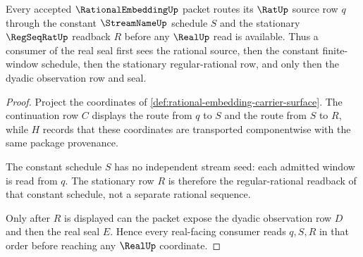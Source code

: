 \begin{theorem}
\label{thm:rational-embedding-constant-sequence-route}
Every accepted $\RationalEmbeddingUp$ packet routes its $\RatUp$ source row $q$ through the constant $\StreamNameUp$ schedule $S$ and the stationary $\RegSeqRatUp$ readback $R$ before any $\RealUp$ read is available. Thus a consumer of the real seal first sees the rational source, then the constant finite-window schedule, then the stationary regular-rational row, and only then the dyadic observation row and seal.
\end{theorem}
\begin{proof}
Project the coordinates of \autoref{def:rational-embedding-carrier-surface}. The continuation row $C$ displays the route from $q$ to $S$ and the route from $S$ to $R$, while $H$ records that these coordinates are transported componentwise with the same package provenance.

The constant schedule $S$ has no independent stream seed: each admitted window is read from $q$. The stationary row $R$ is therefore the regular-rational readback of that constant schedule, not a separate rational sequence.

Only after $R$ is displayed can the packet expose the dyadic observation row $D$ and then the real seal $E$. Hence every real-facing consumer reads $q,S,R$ in that order before reaching any $\RealUp$ coordinate.
\end{proof}

